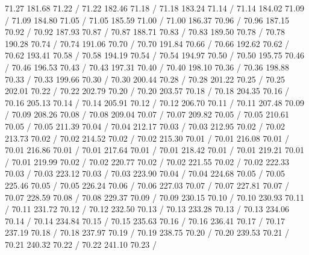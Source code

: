 { 71.27 181.68 71.22 /
 71.22 182.46 71.18 /
 71.18 183.24 71.14 /
 71.14 184.02 71.09 /
 71.09 184.80 71.05 /
 71.05 185.59 71.00 /
 71.00 186.37 70.96 /
 70.96 187.15 70.92 /
 70.92 187.93 70.87 /
 70.87 188.71 70.83 /
 70.83 189.50 70.78 /
 70.78 190.28 70.74 /
 70.74 191.06 70.70 /
 70.70 191.84 70.66 /
 70.66 192.62 70.62 /
 70.62 193.41 70.58 /
 70.58 194.19 70.54 /
 70.54 194.97 70.50 /
 70.50 195.75 70.46 /
 70.46 196.53 70.43 /
 70.43 197.31 70.40 /
 70.40 198.10 70.36 /
 70.36 198.88 70.33 /
 70.33 199.66 70.30 /
 70.30 200.44 70.28 /
 70.28 201.22 70.25 /
 70.25 202.01 70.22 /
 70.22 202.79 70.20 /
 70.20 203.57 70.18 /
 70.18 204.35 70.16 /
 70.16 205.13 70.14 /
 70.14 205.91 70.12 /
 70.12 206.70 70.11 /
 70.11 207.48 70.09 /
 70.09 208.26 70.08 /
 70.08 209.04 70.07 /
 70.07 209.82 70.05 /
 70.05 210.61 70.05 /
 70.05 211.39 70.04 /
 70.04 212.17 70.03 /
 70.03 212.95 70.02 /
 70.02 213.73 70.02 /
 70.02 214.52 70.02 /
 70.02 215.30 70.01 /
 70.01 216.08 70.01 /
 70.01 216.86 70.01 /
 70.01 217.64 70.01 /
 70.01 218.42 70.01 /
 70.01 219.21 70.01 /
 70.01 219.99 70.02 /
 70.02 220.77 70.02 /
 70.02 221.55 70.02 /
 70.02 222.33 70.03 /
 70.03 223.12 70.03 /
 70.03 223.90 70.04 /
 70.04 224.68 70.05 /
 70.05 225.46 70.05 /
 70.05 226.24 70.06 /
 70.06 227.03 70.07 /
 70.07 227.81 70.07 /
 70.07 228.59 70.08 /
 70.08 229.37 70.09 /
 70.09 230.15 70.10 /
 70.10 230.93 70.11 /
 70.11 231.72 70.12 /
 70.12 232.50 70.13 /
 70.13 233.28 70.13 /
 70.13 234.06 70.14 /
 70.14 234.84 70.15 /
 70.15 235.63 70.16 /
 70.16 236.41 70.17 /
 70.17 237.19 70.18 /
 70.18 237.97 70.19 /
 70.19 238.75 70.20 /
 70.20 239.53 70.21 /
 70.21 240.32 70.22 /
 70.22 241.10 70.23 /
}
